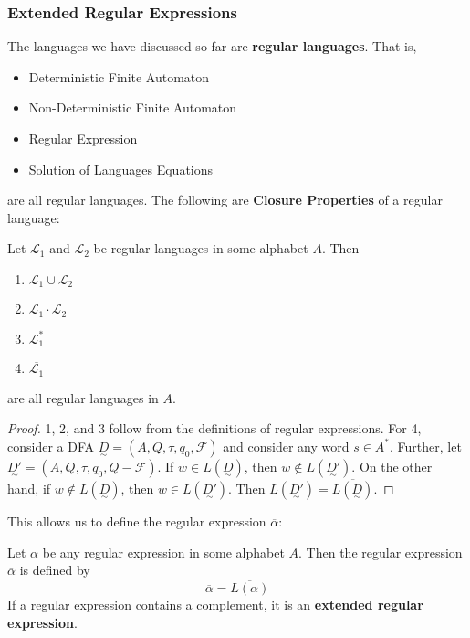 \subsubsection{Extended Regular Expressions}\label{subsubsec:extended-regular-expressions"}
The languages we have discussed so far are \textbf{regular languages}. That is, 

\begin{itemize}
      \item Deterministic Finite Automaton
      \item Non-Deterministic Finite Automaton
      \item Regular Expression
      \item Solution of Languages Equations
\end{itemize}

are all regular languages. The following are \textbf{Closure Properties} of a regular language:

\begin{theorem}
      Let \(\mathcal{L_1}\) and \(\mathcal{L_2}\) be regular languages in some alphabet \(A\). Then
      \begin{enumerate}[1.]
            \item \(\mathcal{L}_1\cup\mathcal{L}_2\)
            \item \(\mathcal{L}_1\cdot \mathcal{L}_2\)
            \item \(\mathcal{L}_1^*\)
            \item \(\overline{\mathcal{L}_1}\)
      \end{enumerate}

      are all regular languages in \(A\).
\end{theorem}

\begin{proof}
      1, 2, and 3 follow from the definitions of regular expressions. For 4, consider a DFA \(\underset{\sim}{D}=(A, Q, \tau, q_0, \mathcal{F})\) and consider any word \(s\in A^*\). Further, let \(\underset{\sim}{D'}=(A, Q, \tau, q_0, Q-\mathcal{F})\). If \(w\in L(\underset{\sim}{D})\), then \(w\not\in L(\underset{\sim}{D'})\). On the other hand, if \(w\not\in L(\underset{\sim}{D})\), then \(w\in L(\underset{\sim}{D'})\). Then \(L(\underset{\sim}{D'})=\overline{L(\underset{\sim}{D})}\).
\end{proof}

This allows us to define the regular expression \(\overline{\alpha}\):

\begin{definition}
      Let \(\alpha \) be any regular expression in some alphabet \(A\). Then the regular expression \(\overline{\alpha}\) is defined by \[\overline{\alpha}=\overline{L(\alpha)}\] If a regular expression contains a complement, it is an \textbf{extended regular expression}.
\end{definition}

